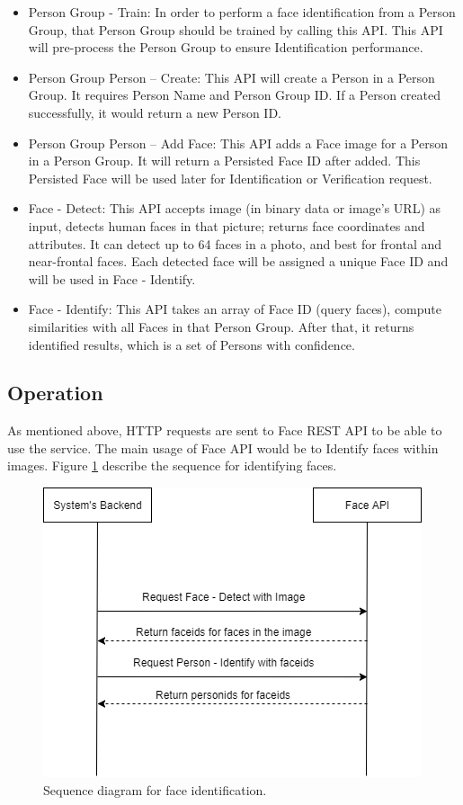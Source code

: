 \begin{itemize}
\item Person Group - Train: In order to perform a face identification from a Person Group, that Person Group should be trained by calling this API. This API will pre-process the Person Group to ensure Identification performance.
\item Person Group Person – Create: This API will create a Person in a Person Group. It requires Person Name and Person Group ID. If a Person created successfully, it would return a new Person ID.
\item Person Group Person – Add Face: This API adds a Face image for a Person in a Person Group. It will return a Persisted Face ID after added. This Persisted Face will be used later for Identification or Verification request.
\item Face - Detect: This API accepts image (in binary data or image’s URL) as input, detects human faces in that picture; returns face coordinates and attributes. It can detect up to 64 faces in a photo, and best for frontal and near-frontal faces. Each detected face will be assigned a unique Face ID and will be used in Face - Identify.
\item Face - Identify: This API takes an array of Face ID (query faces), compute similarities with all Faces in that Person Group. After that, it returns identified results, which is a set of Persons with confidence.
\end{itemize}
\subsection{Operation}
As mentioned above, HTTP requests are sent to Face REST API to be able to use the service. The main usage of Face API would be to Identify faces within images. Figure \ref{chap4:face_identify} describe the sequence for identifying faces.
\begin{center}
    \begin{figure}[H]
    \centering
    \includegraphics[width=0.75\columnwidth]{images/chap4/face_identify.png}
	\caption{Sequence diagram for face identification. }
	\label{chap4:face_identify}
    \end{figure}
\end{center}

